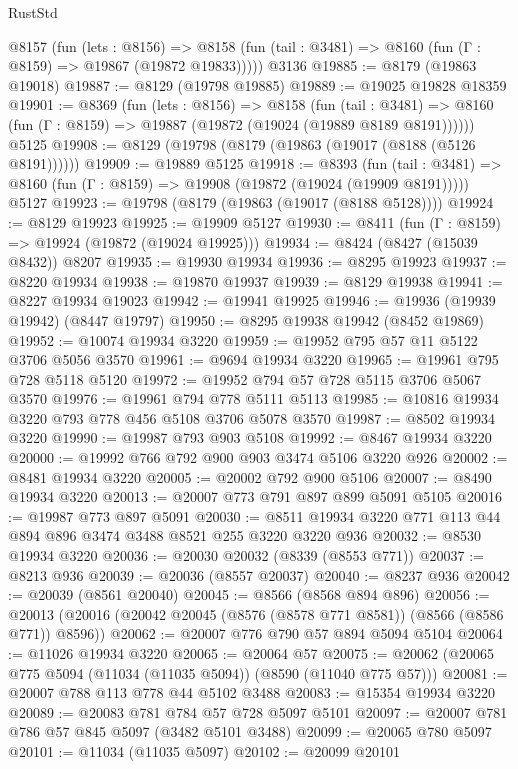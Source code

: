 \begin{lexlean}{RustStd}
\begin{coremodule}
    @8157
      (fun (lets : @8156) =>
      @8158 (fun (tail : @3481) => @8160 (fun (Γ : @8159) => @19867 (@19872 @19833)))))
    @3136
@19885 := @8179 (@19863 @19018)
@19887 := @8129 (@19798 @19885)
@19889 := @19025 @19828 @18359
@19901 := @8369
    (fun (lets : @8156) =>
    @8158
      (fun (tail : @3481) =>
      @8160 (fun (Γ : @8159) => @19887 (@19872 (@19024 (@19889 @8189 @8191))))))
    @5125
@19908 := @8129 (@19798 (@8179 (@19863 (@19017 (@8188 (@5126 @8191))))))
@19909 := @19889 @5125
@19918 := @8393
    (fun (tail : @3481) => @8160 (fun (Γ : @8159) => @19908 (@19872 (@19024 (@19909 @8191)))))
    @5127
@19923 := @19798 (@8179 (@19863 (@19017 (@8188 @5128))))
@19924 := @8129 @19923
@19925 := @19909 @5127
@19930 := @8411 (fun (Γ : @8159) => @19924 (@19872 (@19024 @19925)))
@19934 := @8424 (@8427 (@15039 @8432)) @8207
@19935 := @19930 @19934
@19936 := @8295 @19923
@19937 := @8220 @19934
@19938 := @19870 @19937
@19939 := @8129 @19938
@19941 := @8227 @19934 @19023
@19942 := @19941 @19925
@19946 := @19936 (@19939 @19942) (@8447 @19797)
@19950 := @8295 @19938 @19942 (@8452 @19869)
@19952 := @10074 @19934 @3220
@19959 := @19952 @795 @57 @11 @5122 @3706 @5056 @3570
@19961 := @9694 @19934 @3220
@19965 := @19961 @795 @728 @5118 @5120
@19972 := @19952 @794 @57 @728 @5115 @3706 @5067 @3570
@19976 := @19961 @794 @778 @5111 @5113
@19985 := @10816 @19934 @3220 @793 @778 @456 @5108 @3706 @5078 @3570
@19987 := @8502 @19934 @3220
@19990 := @19987 @793 @903 @5108
@19992 := @8467 @19934 @3220
@20000 := @19992 @766 @792 @900 @903 @3474 @5106 @3220 @926
@20002 := @8481 @19934 @3220
@20005 := @20002 @792 @900 @5106
@20007 := @8490 @19934 @3220
@20013 := @20007 @773 @791 @897 @899 @5091 @5105
@20016 := @19987 @773 @897 @5091
@20030 := @8511 @19934 @3220 @771 @113 @44 @894 @896 @3474 @3488 @8521 @255 @3220 @3220 @936
@20032 := @8530 @19934 @3220
@20036 := @20030 @20032 (@8339 (@8553 @771))
@20037 := @8213 @936
@20039 := @20036 (@8557 @20037)
@20040 := @8237 @936
@20042 := @20039 (@8561 @20040)
@20045 := @8566 (@8568 @894 @896)
@20056 := @20013 (@20016 (@20042 @20045 (@8576 (@8578 @771 @8581)) (@8566 (@8586 @771)) @8596))
@20062 := @20007 @776 @790 @57 @894 @5094 @5104
@20064 := @11026 @19934 @3220
@20065 := @20064 @57
@20075 := @20062 (@20065 @775 @5094 (@11034 (@11035 @5094)) (@8590 (@11040 @775 @57)))
@20081 := @20007 @788 @113 @778 @44 @5102 @3488
@20083 := @15354 @19934 @3220
@20089 := @20083 @781 @784 @57 @728 @5097 @5101
@20097 := @20007 @781 @786 @57 @845 @5097 (@3482 @5101 @3488)
@20099 := @20065 @780 @5097
@20101 := @11034 (@11035 @5097)
@20102 := @20099 @20101

\end{coremodule}
\end{lexlean}
